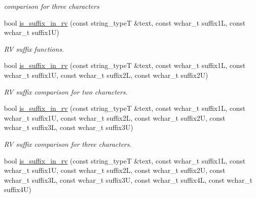 \begin{DoxyCompactItemize}
\begin{DoxyCompactList}\small\item\em comparison for three characters \end{DoxyCompactList}\item 
bool \hyperlink{classstemming_1_1stem_a2c92d7447b5cc97d0fca165d2b0e7d68}{is\+\_\+suffix\+\_\+in\+\_\+rv} (const string\+\_\+type\+T \&text, const wchar\+\_\+t suffix1\+L, const wchar\+\_\+t suffix1\+U)
\begin{DoxyCompactList}\small\item\em R\+V suffix functions. \end{DoxyCompactList}\item 
\hypertarget{classstemming_1_1stem_a359356fbaafc3c7154d94fda6916ffa0}{bool \hyperlink{classstemming_1_1stem_a359356fbaafc3c7154d94fda6916ffa0}{is\+\_\+suffix\+\_\+in\+\_\+rv} (const string\+\_\+type\+T \&text, const wchar\+\_\+t suffix1\+L, const wchar\+\_\+t suffix1\+U, const wchar\+\_\+t suffix2\+L, const wchar\+\_\+t suffix2\+U)}\label{classstemming_1_1stem_a359356fbaafc3c7154d94fda6916ffa0}

\begin{DoxyCompactList}\small\item\em R\+V suffix comparison for two characters. \end{DoxyCompactList}\item 
\hypertarget{classstemming_1_1stem_a00fa5d00ff53320a437fe96a5bfa8f44}{bool \hyperlink{classstemming_1_1stem_a00fa5d00ff53320a437fe96a5bfa8f44}{is\+\_\+suffix\+\_\+in\+\_\+rv} (const string\+\_\+type\+T \&text, const wchar\+\_\+t suffix1\+L, const wchar\+\_\+t suffix1\+U, const wchar\+\_\+t suffix2\+L, const wchar\+\_\+t suffix2\+U, const wchar\+\_\+t suffix3\+L, const wchar\+\_\+t suffix3\+U)}\label{classstemming_1_1stem_a00fa5d00ff53320a437fe96a5bfa8f44}

\begin{DoxyCompactList}\small\item\em R\+V suffix comparison for three characters. \end{DoxyCompactList}\item 
\hypertarget{classstemming_1_1stem_acdaff4e73f7f3841beed04775b5d4f21}{bool \hyperlink{classstemming_1_1stem_acdaff4e73f7f3841beed04775b5d4f21}{is\+\_\+suffix\+\_\+in\+\_\+rv} (const string\+\_\+type\+T \&text, const wchar\+\_\+t suffix1\+L, const wchar\+\_\+t suffix1\+U, const wchar\+\_\+t suffix2\+L, const wchar\+\_\+t suffix2\+U, const wchar\+\_\+t suffix3\+L, const wchar\+\_\+t suffix3\+U, const wchar\+\_\+t suffix4\+L, const wchar\+\_\+t suffix4\+U)}\label{classstemming_1_1stem_acdaff4e73f7f3841beed04775b5d4f21}


\end{DoxyCompactItemize}
